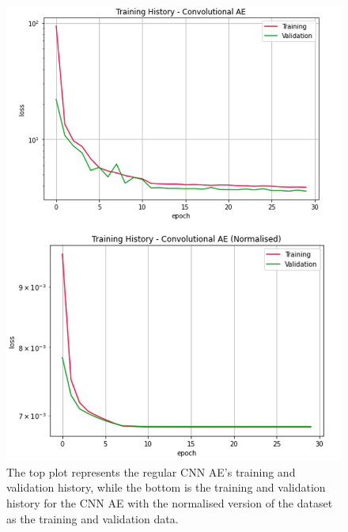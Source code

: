 \documentclass[a4paper]{article}
\theoremstyle{plain}
\theoremstyle{definition}
\begin{document}
            \begin{figure}[H]
                \centering
                \begin{minipage}[c]{0.45\linewidth}
                    \centering
                    \includegraphics[width=\textwidth]{cnn-training.png}
                    \caption{The top plot represents the regular CNN AE's training and validation history, while the bottom is the training and validation history for the CNN AE with the normalised version of the dataset as the training and validation data.}
                    \label{fig:cnn-training}
                \end{minipage}
                \hfill
                \begin{minipage}[c]{0.45\linewidth}
                    \centering

\end{minipage}
\end{figure}
\end{document}
